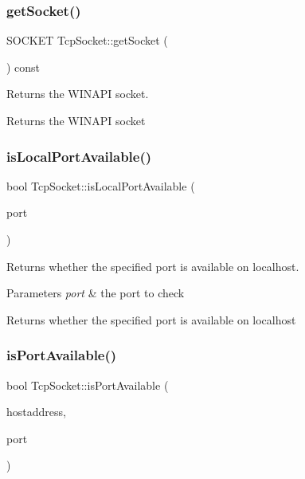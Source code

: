 \subsubsection{\texorpdfstring{getSocket()}{getSocket()}}
{\footnotesize\ttfamily S\+O\+C\+K\+ET Tcp\+Socket\+::get\+Socket (\begin{DoxyParamCaption}{ }\end{DoxyParamCaption}) const}



Returns the W\+I\+N\+A\+PI socket. 

\begin{DoxyReturn}{Returns}
the W\+I\+N\+A\+PI socket 
\end{DoxyReturn}
\mbox{\label{class_tcp_socket_a411dcd4e6875ed636eb96cdac1ab18b9}} 
\subsubsection{\texorpdfstring{isLocalPortAvailable()}{isLocalPortAvailable()}}
{\footnotesize\ttfamily bool Tcp\+Socket\+::is\+Local\+Port\+Available (\begin{DoxyParamCaption}\item[{ushort}]{port }\end{DoxyParamCaption})\hspace{0.3cm}{\ttfamily [static]}}



Returns whether the specified port is available on localhost. 


\begin{DoxyParams}{Parameters}
{\em port} & the port to check \\
\hline
\end{DoxyParams}
\begin{DoxyReturn}{Returns}
whether the specified port is available on localhost 
\end{DoxyReturn}
\mbox{\label{class_tcp_socket_a133a664281c276c9e75d961175814d7d}} 
\subsubsection{\texorpdfstring{isPortAvailable()}{isPortAvailable()}}
{\footnotesize\ttfamily bool Tcp\+Socket\+::is\+Port\+Available (\begin{DoxyParamCaption}\item[{const A\+String \&}]{hostaddress,  }\item[{ushort}]{port }\end{DoxyParamCaption})\hspace{0.3cm}{\ttfamily [static]}}



